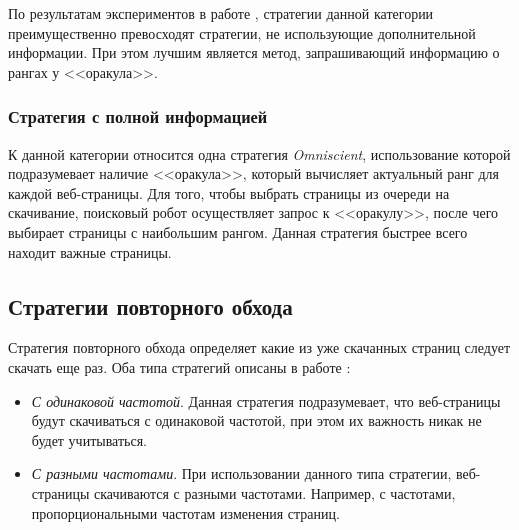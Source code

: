 По результатам экспериментов в работе \cite{Castillo}, стратегии данной категории преимущественно превосходят стратегии, не использующие дополнительной информации. При этом лучшим является метод, запрашивающий информацию о рангах у <<оракула>>.

\subsubsection*{Стратегия с полной информацией}

К данной категории относится одна стратегия \textit{Omniscient}, использование которой подразумевает наличие <<оракула>>, который вычисляет актуальный ранг для каждой веб-страницы. Для того, чтобы выбрать страницы из очереди на скачивание, поисковый робот осуществляет запрос к <<оракулу>>, после чего выбирает страницы с наибольшим рангом. Данная стратегия быстрее всего находит важные страницы.
 
\subsection{Стратегии повторного обхода}

Стратегия повторного обхода определяет какие из уже скачанных страниц следует скачать еще раз. Оба типа стратегий описаны в работе \cite{Cho}:

\begin{itemize}
\item \textit{С одинаковой частотой}. Данная стратегия подразумевает, что веб-страницы будут скачиваться с одинаковой частотой, при этом их важность никак не будет учитываться.
\item \textit{С разными частотами}. При использовании данного типа стратегии, веб-страницы скачиваются с разными частотами. Например, с частотами, пропорциональными частотам изменения страниц.
\end{itemize}
